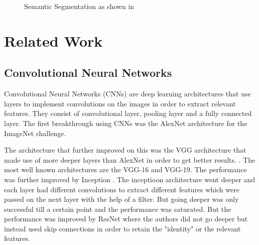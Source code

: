 \documentclass[rnd]{mas_proposal}
\begin{document}
\begin{figure}[htp] 
        \centering
    \caption{Semantic Segmentation as shown in \cite{semantic-segmentation}}%
    \label{fig:semantic_segmentation}%
\end{figure}



\newpage
\section{Related Work}
\subsection{Convolutional Neural Networks}
Convolutional Neural Networks (CNNs) are deep learning architectures that use layers to implement convolutions on the images in order to extract relevant features. They consist of convolutional layer, pooling layer and a fully connected layer. The first breakthrough using CNNs was the AlexNet architecture \cite{alex-net} for the ImageNet challenge. 

The architecture that further improved on this was the VGG architecture that made use of more deeper layers than AlexNet in order to get better results. \cite{VGG}. The most well known architectures are the VGG-16 and VGG-19. The performance was further improved by Inception \cite{Inception}. The inceptioon architecture went deeper and each layer had different convolutions to extract different features which were passed on the next layer with the help of a filter. But going deeper was only successful till a certain point and the performance was saturated. But the performance was improved by ResNet \cite{Res-Net} where the authors did not go deeper but instead used skip connections in order to retain the "identity" or the relevant features. 
\end{document}
